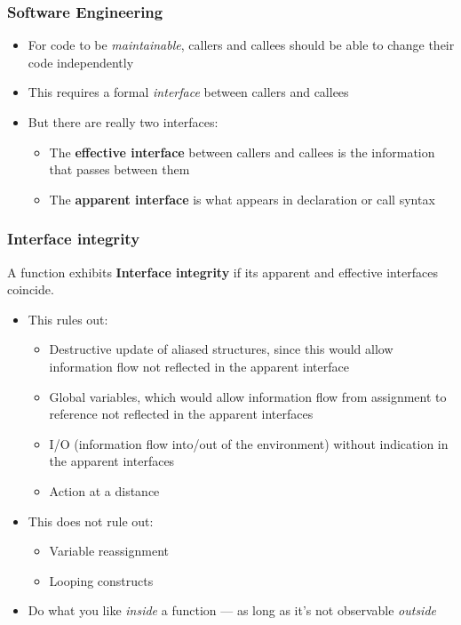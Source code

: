 \documentclass[12pt]{beamer}
\begin{document}
\begin{frame}
\frametitle{Software Engineering}
\begin{itemize}
\item For code to be \emph{maintainable}, callers and callees should be
  able to change their code independently
\item This requires a formal \emph{interface} between callers and callees
\item But there are really two interfaces:
  \begin{itemize}
  \item The \textbf{effective interface} between callers and
    callees is the information that passes between them
  \item The \textbf{apparent interface} is what appears in declaration
    or call syntax
  \end{itemize}
\end{itemize}

\end{frame}


\begin{frame}
\frametitle{Interface integrity}

A function exhibits \textbf{Interface integrity} if its apparent and
effective interfaces coincide.

\begin{itemize}
\item This rules out:
  \begin{itemize}
  \item Destructive update of aliased structures, since this would allow
    information flow not reflected in the apparent interface
  \item Global variables, which would allow information flow from
    assignment to reference not reflected in the apparent interfaces
  \item I/O (information flow into/out of the environment) without
    indication in the apparent interfaces
  \item Action at a distance
  \end{itemize}
\item This does not rule out:
  \begin{itemize}
  \item Variable reassignment
  \item Looping constructs
  \end{itemize}
\item Do what you like \emph{inside} a function --- as long as it's not
  observable \emph{outside}
\end{itemize}

\end{frame}
\end{document}
